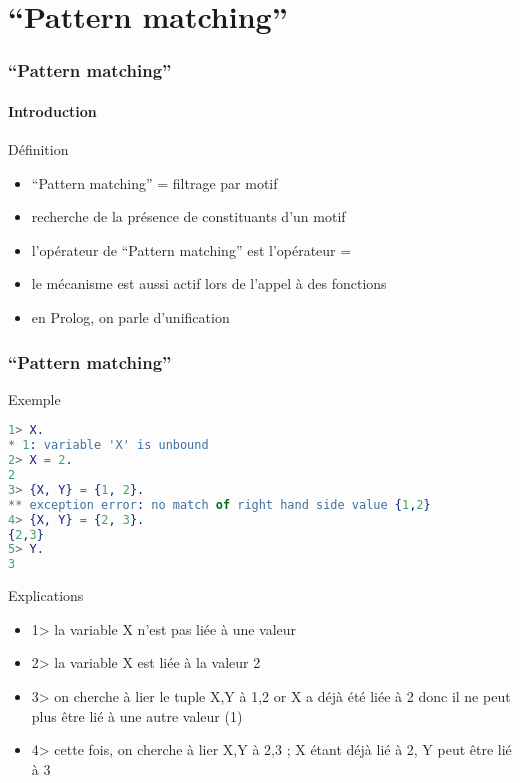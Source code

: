 \section{``Pattern matching''}

\begin{frame}[fragile]
  \frametitle{``Pattern matching''}
  \framesubtitle{Introduction}

  \begin{block}{Définition}
    \begin{itemize}
      \item ``Pattern matching'' = filtrage par motif
      \item recherche de la présence de constituants d'un motif
      \item l'opérateur de ``Pattern matching'' est l'opérateur =
      \item le mécanisme est aussi actif lors de l'appel à des fonctions
      \item en Prolog, on parle d'unification
    \end{itemize}
  \end{block}

\end{frame}

\begin{frame}[fragile]
  \frametitle{``Pattern matching''}

  \begin{exampleblock}{Exemple}
    \begin{lstlisting}[language=erlang]
1> X.
* 1: variable 'X' is unbound
2> X = 2.
2
3> {X, Y} = {1, 2}.
** exception error: no match of right hand side value {1,2}
4> {X, Y} = {2, 3}.
{2,3}
5> Y.
3
    \end{lstlisting}
  \end{exampleblock}

  \begin{alertblock}{Explications}
    \begin{itemize}
    \item 1> la variable X n'est pas liée à une valeur
    \item 2> la variable X est liée à la valeur 2
    \item 3> on cherche à lier le tuple {X,Y} à {1,2} or X a déjà été liée à
      2 donc il ne peut plus être lié à une autre valeur (1)
    \item 4> cette fois, on cherche à lier {X,Y} à {2,3} ; X étant déjà lié à 2,
      Y peut être lié à 3
    \end{itemize}
  \end{alertblock}

\end{frame}

